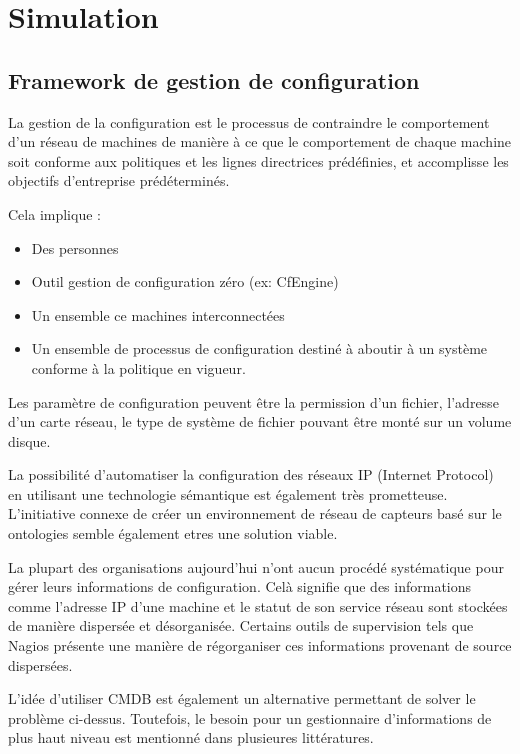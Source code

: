 \chapter{Simulation}

\section{Framework de gestion de configuration}

La gestion de la configuration est le processus de contraindre le comportement
d'un réseau de machines de manière à ce que le comportement de chaque machine
soit conforme aux politiques et les lignes directrices prédéfinies, et
accomplisse les objectifs d'entreprise prédéterminés.

Cela implique :

\begin{itemize}
  \item Des personnes
  \item Outil gestion de configuration zéro (ex: CfEngine)
  \item Un ensemble ce machines interconnectées
  \item Un ensemble de processus de configuration destiné à aboutir à un système
	  conforme à la politique en vigueur.
\end{itemize}

Les paramètre de configuration peuvent être la permission d'un fichier,
l'adresse d'un carte réseau, le type de système de fichier pouvant être monté
sur un volume disque.

La possibilité d'automatiser la configuration des réseaux IP (Internet
Protocol) en utilisant une technologie sémantique est également très
prometteuse. L'initiative connexe de créer un environnement de réseau de
capteurs basé sur le ontologies semble également etres une solution viable.

La plupart des organisations aujourd'hui n'ont aucun procédé systématique pour
gérer leurs informations de configuration. Celà signifie que des informations
comme l'adresse IP d'une machine et le statut de son service réseau sont
stockées de manière dispersée et désorganisée. Certains outils de supervision
tels que Nagios présente une manière de régorganiser ces informations provenant
de source dispersées.

L'idée d'utiliser CMDB est également un alternative permettant de solver le
problème ci-dessus. Toutefois, le besoin pour un gestionnaire d'informations de
plus haut niveau est mentionné dans plusieures littératures.

